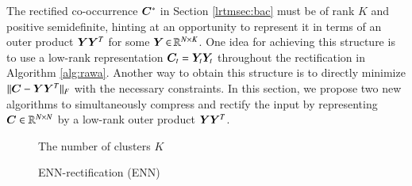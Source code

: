 The rectified co-occurrence $\bm{C}^*$ in Section \ref{lrtmsec:bac} must be of rank
$K$ and positive semidefinite, hinting at an opportunity to represent it in
terms of an outer product $\bm{Y} \bm{Y}^T$ for some $\bm{Y} \operatorname{\in} \mathbb{R}^{N \mathrel{\times} K}$. One
idea for achieving this structure is to use a low-rank representation $\bm{C}_t =
\bm{Y}_t \bm{Y}_t$ throughout the rectification in Algorithm \ref{alg:rawa}. Another
way to obtain this structure is to directly minimize $\|\bm{C} - \bm{Y} \bm{Y}^T\|_F$
with the necessary constraints. In this section, we propose two new algorithms
to simultaneously compress and rectify the input by representing $\bm{C} \in \mathbb{R}^
{N \mathrel{\times} N}$ by a low-rank outer product $\bm{Y} \bm{Y}^T$.
\begin{figure}[ht]
	\begin{algorithm}[H]
		\DontPrintSemicolon
		\hspace{28px} The number of clusters $K$\\
		\caption{ENN-rectification (ENN)}
	\label{alg:enn}        
	\end{algorithm}
\end{figure}
